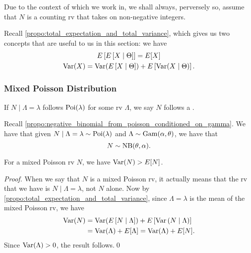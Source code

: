 \documentclass[notoc,notitlepage]{tufte-book}
\begin{document}
\begin{remark}
  Due to the context of which we work in, we shall always, perversely so, assume that $N$ is a counting rv that takes on non-negative integers.
\end{remark}

\begin{note}
  Recall \cref{propo:total_expectation_and_total_variance}, which gives us two concepts that are useful to us in this section: we have
  \begin{gather*}
    E \left[ E \left[ X \mid \Theta \right] \right] = E [ X ] \\
    \operatorname{Var}(X) = \operatorname{Var}( E \left[ X \mid \Theta \right] ) + E \left[ \operatorname{Var}(X \mid \Theta) \right].
  \end{gather*}
\end{note}

\subsubsection{Mixed Poisson Distribution}%
\label{ssub:mixed_poisson_distribution}

\begin{defn}\label{defn:mixed_poisson_distribution}
  If $N \mid \Lambda = \lambda$ follows $\operatorname{Poi}(\lambda)$ for some rv $\Lambda$, we say $N$ follows a .
\end{defn}

\begin{eg}
  Recall \cref{propo:negative_binomial_from_poisson_conditioned_on_gamma}. We have that given $N \mid \Lambda = \lambda \sim \operatorname{Poi}(\lambda)$ and $\Lambda \sim \operatorname{Gam}(\alpha, \theta)$, we have that
  \begin{equation*}
    N \sim \operatorname{NB}(\theta, \alpha).
  \end{equation*}
\end{eg}

\begin{propo}\label{propo:mixed_poisson_distribution_has_a_variance_greater_than_its_mean}
  For a mixed Poisson rv $N$, we have $\operatorname{Var}(N) > E[N]$.
\end{propo}

\begin{proof}
  When we say that $N$ is a mixed Poisson rv, it actually means that the rv that we have is $N \mid \Lambda = \lambda$, not $N$ alone. Now by \cref{propo:total_expectation_and_total_variance}, since $\Lambda = \lambda$ is the mean of the mixed Poisson rv, we have
  \begin{align*}
    \operatorname{Var}(N) &= \operatorname{Var}( E \left[ N \mid \Lambda \right] ) + E \left[ \operatorname{Var} \left( N \mid \Lambda \right) \right] \\
            &= \operatorname{Var}( \Lambda ) + E [ \Lambda ] = \operatorname{Var}(\Lambda) + E[ N ].
  \end{align*}
  Since $\operatorname{Var}(\Lambda) > 0$, the result follows.\qed\
\end{proof}
\end{document}
